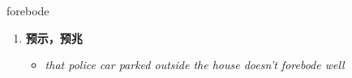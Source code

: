 
\begin{frame}
{\huge forebode}
\begin{center}
\begin{enumerate}\Large
  \item \textbf{预示，预兆}
  \begin{itemize}
    \item \em{\Large{that police car parked outside the house doesn't forebode well}}
  \end{itemize}
\end{enumerate}
\end{center}
\end{frame}
